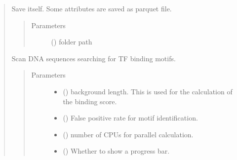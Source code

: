\documentclass[letterpaper,10pt,english]{sphinxmanual}
\begin{document}
\begin{quote}
\begin{fulllineitems}

\begin{fulllineitems}
\label{\detokenize{modules/celloracle.motif_analysis:celloracle.motif_analysis.TFinfo.save_as_parquet}}
Save itself. Some attributes are saved as parquet file.
\begin{quote}\begin{description}
\item[{Parameters}] \leavevmode
{} () \textendash{} folder path

\end{description}\end{quote}

\end{fulllineitems}


\begin{fulllineitems}
\label{\detokenize{modules/celloracle.motif_analysis:celloracle.motif_analysis.TFinfo.scan}}
Scan DNA sequences searching for TF binding motifs.
\begin{quote}\begin{description}
\item[{Parameters}] \leavevmode\begin{itemize}
\item {} 
 () \textendash{} background length. This is used for the calculation of the binding score.

\item {} 
 () \textendash{} False positive rate for motif identification.

\item {} 
 () \textendash{} number of CPUs for parallel calculation.

\item {} 
 () \textendash{} Whether to show a progress bar.


\end{itemize}
\end{description}
\end{quote}
\end{fulllineitems}
\end{fulllineitems}
\end{quote}
\end{document}
